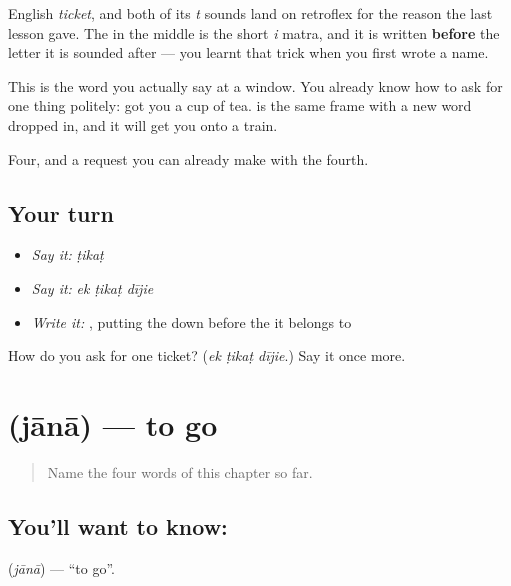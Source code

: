English \emph{ticket}, and both of its \emph{t} sounds land on retroflex  for the reason the last lesson gave. The  in the middle is the short \emph{i} matra, and it is written \textbf{before} the letter it is sounded after — you learnt that trick when you first wrote a name.

This is the word you actually say at a window. You already know how to ask for one thing politely: \textbf{  } got you a cup of tea. \textbf{  } is the same frame with a new word dropped in, and it will get you onto a train.

\begin{grammarlens}[title={What you've built}]
Four, and a request you can already make with the fourth.
\end{grammarlens}

\subsection*{Your turn}
\begin{itemize}
\raggedright
  \item \emph{Say it:} \emph{ṭikaṭ}
  \item \emph{Say it:} \emph{ek ṭikaṭ dījie}
  \item \emph{Write it:} , putting the  down before the  it belongs to
\end{itemize}

\begin{tcolorbox}[breakable,colback=teal!4,colframe=teal!35!black,title={Before you move on}]
How do you ask for one ticket? (\emph{ek ṭikaṭ dījie}.) Say it once more.
\end{tcolorbox}
\section[jānā]{ (jānā) — to go}

\label{lesson:HI-C69-go}



\begin{quote}
Name the four words of this chapter so far.
\end{quote}

\subsection*{You'll want to know: }
\textbf{} (\emph{jānā}) — \textquotedblleft{}to go\textquotedblright{}.


